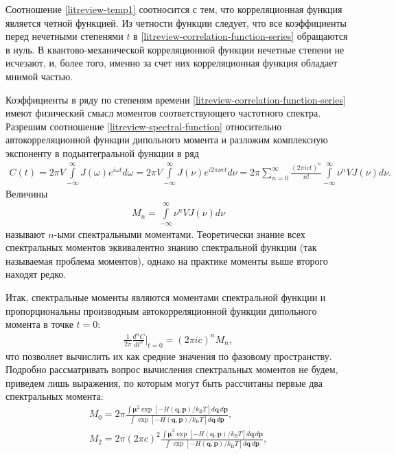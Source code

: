 \documentclass[12pt]{article}
\newcommand{\mf}{\mathbf}
\newcommand{\lb}{\left(}
\newcommand{\rb}{\right)}
\newcommand{\lsq}{\left[}
\newcommand{\rsq}{\right]}
\newcommand{\kb}{k_\text{B}}
\newcommand{\intty}{\int\limits_{-\infty}^\infty}
\newcommand{\bs}{\boldsymbol}
\begin{document}
Соотношение \eqref{litreview-temp1} соотносится с тем, что корреляционная функция является четной функцией. Из четности функции следует, что все коэффициенты перед нечетными степенями $t$ в \eqref{litreview-correlation-function-series} обращаются в нуль. В квантово-механической корреляционной функции нечетные степени не исчезают, и, более того, именно за счет них корреляционная функция обладает мнимой частью. \par
Коэффициенты в ряду по степеням времени \eqref{litreview-correlation-function-series} имеют физический смысл моментов соответствующего частотного спектра. Разрешим соотношение \eqref{litreview-spectral-function} относительно автокорреляционной функции дипольного момента и разложим комплексную экспоненту в подынтегральной функции в ряд
\begin{gather}
    C(t) = 2\pi V \intty J(\omega) e^{i \omega t} d \omega = 2 \pi V \intty J(\nu) e^{i 2\pi \nu c t} d\nu = 2 \pi \sum_{n = 0}^\infty \frac{\lb 2\pi i c t\rb^n}{n!} \intty \nu^n V J(\nu) d\nu. 
\end{gather}
%
Величины
\begin{gather}
    M_n = \intty \nu^n V J(\nu) d\nu \label{litreview-spectral-function-moments}
\end{gather}
%
называют $n$-ыми спектральными моментами. Теоретически знание всех спектральных моментов эквивалентно знанию спектральной функции (так называемая проблема моментов), однако на практике моменты выше второго находят редко. \par
Итак, спектральные моменты являются моментами спектральной функции и пропорциональны производным автокорреляционной функции дипольного момента в точке $t = 0$:
\begin{gather}
    \frac{1}{2 \pi} \frac{d^n C}{dt^n} \Bigg\vert_{t = 0} = \lb 2 \pi ic \rb^n M_n,
\end{gather}
%
что позволяет вычислить их как средние значения по фазовому пространству. Подробно рассматривать вопрос вычисления спектральных моментов не будем, приведем лишь выражения, по которым могут быть рассчитаны первые два спектральных момента:
\begin{gather}
    M_0 = 2 \pi \frac{\displaystyle \int \bs{\mu}^2 \exp \lsq -H(\mf{q}, \mf{p}) / \kb T \rsq d\mf{q} \, d\mf{p}}{\displaystyle \int \exp \lsq -H(\mf{q}, \mf{p}) / \kb T \rsq d\mf{q} \, d\mf{p}}, \label{litreview-m0-phase-space} \\
    M_2 = 2 \pi (2 \pi c)^2 \frac{\displaystyle \int \dot{\bs{\mu}}^2 \exp \lsq -H(\mf{q}, \mf{p}) / \kb T \rsq d\mf{q} \, d\mf{p}}{\displaystyle \int \exp \lsq -H(\mf{q}, \mf{p}) / \kb T \rsq d\mf{q} \, d\mf{p}}, \label{litreview-m2-phase-space}
\end{gather}
\end{document}
